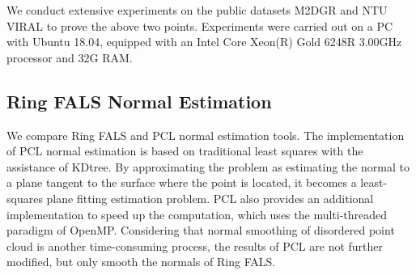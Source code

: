 \documentclass[letterpaper, 10 pt, conference]{ieeeconf}  %
\begin{document}
We conduct extensive experiments on the public datasets M2DGR\cite{yin2021m2dgr} and NTU VIRAL\cite{nguyen2022ntu} to prove the above two points.
Experiments were carried out on a PC with Ubuntu 18.04, equipped with an Intel Core Xeon(R) Gold 6248R 3.00GHz processor and 32G RAM.


\subsection{Ring FALS Normal Estimation}
We compare Ring FALS and PCL\cite{rusu20113d} normal estimation tools.
The implementation of PCL normal estimation is based on traditional least squares with the assistance of KDtree.
By approximating the problem as estimating the normal to a plane tangent to the surface where the point is located, it becomes a least-squares plane fitting estimation problem.
PCL also provides an additional implementation to speed up the computation, which uses the multi-threaded paradigm of OpenMP\cite{chandra2001parallel}.
Considering that normal smoothing of disordered point cloud is another time-consuming process, the results of PCL are not further modified, but only smooth the normals of Ring FALS.
\end{document}
